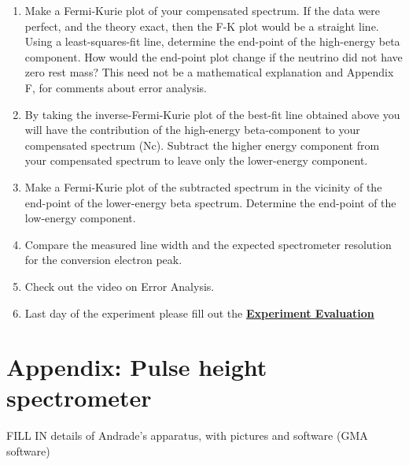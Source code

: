 \documentclass{../lab}
\begin{document}
\begin{enumerate}
\begin{enumerate}
        \item Make a Fermi-Kurie plot of your compensated spectrum. If the data were perfect, and the theory exact, then the F-K plot would be a straight line. Using a least-squares-fit line, determine the end-point of the high-energy beta component. How would the end-point plot change if the neutrino did not have zero rest mass? This need not be a mathematical explanation and Appendix F, for comments about error analysis.

        \item By taking the inverse-Fermi-Kurie plot of the best-fit line obtained above you will have the contribution of the high-energy beta-component to your compensated spectrum (Nc). Subtract the higher energy component from your compensated spectrum to leave only the lower-energy component.

        \item Make a Fermi-Kurie plot of the subtracted spectrum in the vicinity of the end-point of the lower-energy beta spectrum. Determine the end-point of the low-energy component.

        \item Compare the measured line width and the expected spectrometer resolution for the conversion electron peak.

        \item Check out the video on Error Analysis.

        \item Last day of the experiment please fill out the \href{\ExperimentEvaluation}{\textbf{Experiment Evaluation}}

    \end{enumerate}

\end{enumerate}

\section{Appendix: Pulse height spectrometer}

FILL IN details of Andrade's apparatus, with pictures and software (GMA software)
\end{document}
